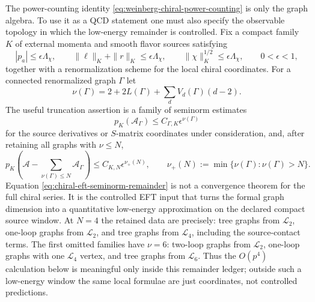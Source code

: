 \begin{controlledapproximation}
\label{ca:chiral-eft-truncation-seminorm}
The power-counting identity \eqref{eq:weinberg-chiral-power-counting} is only
the graph algebra.  To use it as a QCD statement one must also specify the
observable topology in which the low-energy remainder is controlled.  Fix a
compact family \(K\) of external momenta and smooth flavor sources satisfying
\[
  |p_a|\le \epsilon\Lambda_\chi,\qquad
  \|\ell\|_K+\|r\|_K\le \epsilon\Lambda_\chi,\qquad
  \|\chi\|_K^{1/2}\le \epsilon\Lambda_\chi,
  \qquad 0<\epsilon<1,
\]
together with a renormalization scheme for the local chiral coordinates.  For
a connected renormalized graph \(\Gamma\) let
\[
  \nu(\Gamma)=2+2L(\Gamma)+\sum_d V_d(\Gamma)(d-2).
\]
The useful truncation assertion is a family of seminorm estimates
\[
  p_K\!\left(\mathcal A_\Gamma\right)
  \le C_{\Gamma,K}\epsilon^{\nu(\Gamma)}
\]
for the source derivatives or \(S\)-matrix coordinates under consideration,
and, after retaining all graphs with \(\nu\le N\),
\begin{equation}
  p_K\!\left(
    \mathcal A-\sum_{\nu(\Gamma)\le N}\mathcal A_\Gamma
  \right)
  \le C_{K,N}\epsilon^{\nu_+(N)},
  \qquad
  \nu_+(N):=\min\{\nu(\Gamma):\nu(\Gamma)>N\}.
  \label{eq:chiral-eft-seminorm-remainder}
\end{equation}
Equation \eqref{eq:chiral-eft-seminorm-remainder} is not a convergence theorem
for the full chiral series.  It is the controlled EFT input that turns the
formal graph dimension into a quantitative low-energy approximation on the
declared compact source window.  At \(N=4\) the retained data are precisely:
tree graphs from \(\mathcal L_2\), one-loop graphs from \(\mathcal L_2\), and
tree graphs from \(\mathcal L_4\), including the source-contact terms.  The
first omitted families have \(\nu=6\): two-loop graphs from \(\mathcal L_2\),
one-loop graphs with one \(\mathcal L_4\) vertex, and tree graphs from
\(\mathcal L_6\).  Thus the \(O(p^4)\) calculation below is meaningful only
inside this remainder ledger; outside such a low-energy window the same local
formulae are just coordinates, not controlled predictions.
\end{controlledapproximation}

